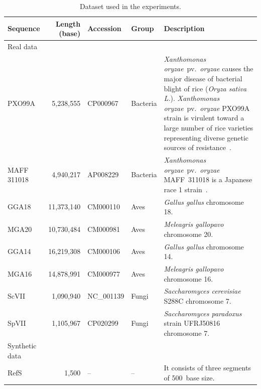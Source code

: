 \documentclass[a4paper,num-refs]{oup-contemporary}
\begin{document}
\begin{table}[h]
  \caption{Dataset used in the experiments.}
  \label{tab.dataset.real}
  \begin{tabularx}{\linewidth}{l@{}rllX}
    \toprule
    Sequence & Length (base) & Accession & Group & Description \\
    \midrule
    Real data \\
    \cmidrule{1-1}
    PXO99A & 5,238,555 & CP000967 & Bacteria & \textit{Xanthomonas oryzae}~pv.~\textit{oryzae} causes the major disease of bacterial blight of rice (\textit{Oryza sativa L.}). 
    \textit{Xanthomonas oryzae}~pv.~\textit{oryzae} PXO99A strain is virulent toward a large number of rice varieties representing diverse genetic sources of resistance~\cite{salzberg2008genome}. \\
    MAFF 311018 & 4,940,217 & AP008229 & Bacteria & \textit{Xanthomonas oryzae}~pv.~\textit{oryzae} MAFF~311018 is a Japanese race 1 strain~\cite{ochiai2005genome}. \\
    \midrule
    GGA18 & 11,373,140 & CM000110 & Aves & \textit{Gallus gallus} chromosome 18. \\
    MGA20 & 10,730,484 & CM000981 & Aves & \textit{Meleagris gallopavo} chromosome 20. \\
    \midrule
    GGA14 & 16,219,308 & CM000106 & Aves & \textit{Gallus gallus} chromosome 14. \\
    MGA16 & 14,878,991 & CM000977 & Aves & \textit{Meleagris gallopavo} chromosome 16. \\
    \midrule
    ScVII & 1,090,940 & NC\_001139 & Fungi & \textit{Saccharomyces cerevisiae} S288C chromosome 7. \\
    SpVII & 1,105,967 & CP020299 & Fungi & \textit{Saccharomyces paradoxus} strain UFRJ50816 chromosome 7. \\
    \midrule
    Synthetic data \\
    \cmidrule{1-1}
    RefS & 1,500 & -- & -- & It consists of three segments of 500~base size. \\

\end{tabularx}
\end{table}
\end{document}
